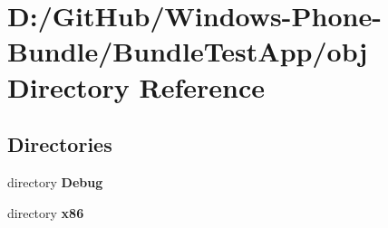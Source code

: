 \section{D\+:/\+Git\+Hub/\+Windows-\/\+Phone-\/\+Bundle/\+Bundle\+Test\+App/obj Directory Reference}
\label{dir_0508259a1b40ead209ed7ddb22beb319}
\subsection*{Directories}
\begin{DoxyCompactItemize}
\item 
directory {\bf Debug}
\item 
directory {\bf x86}
\end{DoxyCompactItemize}
